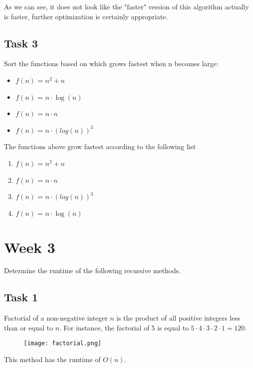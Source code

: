 \documentclass{article}
\begin{document}
As we can see, it does not look like the "faster" version of this algorithm actually is faster, further optimization is certainly appropriate.

\subsection{Task 3}
Sort the functions based on which grows fastest when n becomes large:

\begin{itemize}
\item \(f(n)\) = \( n^2 + n \)
\item \(f(n)\) = \( n \cdot  \log (n) \)
\item \(f(n)\) = \( n \cdot  n \)
\item \(f(n)\) = \( n \cdot  (log(n))^3 \)
\end{itemize}
\newpage 

The functions above grow fastest according to the following list

\begin{enumerate}
    \item \(f(n)\) = \( n^2 + n \)
    \item \(f(n)\) = \( n \cdot  n \)
    \item \(f(n)\) = \( n \cdot  (log(n))^3 \)
    \item \(f(n)\) = \( n \cdot \log (n) \)
\end{enumerate}
\newpage

\section{Week 3}
Determine the runtime of the following recursive methods.

\subsection{Task 1}
Factorial of a non-negative integer \( n \) is the product of all positive integers less than or equal to \( n \). For instance, the factorial of 5 is equal to \( 5 \cdot 4 \cdot 3 \cdot 2 \cdot 1 = 120 \).

\begin{figure}[H]
    \begin{center}
        \texttt{[image: factorial.png]}
    \end{center}
\end{figure}

This method has the runtime of \( O\left( n \right) \).
\end{document}
